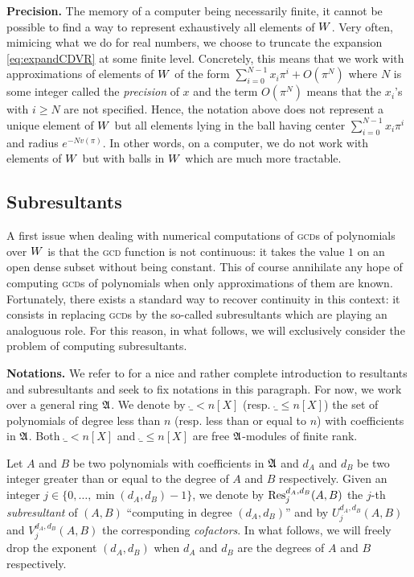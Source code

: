 \documentclass{sig-alternate}
\begin{document}
\noindent
\textbf{Precision.}
The memory of a computer being necessarily finite, it cannot be possible 
to find a way to represent exhaustively all elements of $W$. 
Very often, mimicing what we do for real numbers, we choose to truncate 
the expansion \eqref{eq:expandCDVR} at some finite level. Concretely,
this means that we work with approximations of elements of $W$ of the
form
$\sum_{i=0}^{N-1} x_i \pi^i + O(\pi^N)$
where $N$ is some integer called the \emph{precision} of $x$ and 
the term $O(\pi^N)$ means that the $x_i$'s with $i \geq N$ are not 
specified. Hence, the notation above does not represent a unique
element of $W$ but all elements lying in the ball having center
$\sum_{i=0}^{N-1} x_i \pi^i$ and radius $e^{-N v(\pi)}$. In other
words, on a computer, we do not work with elements of $W$ but with
balls in $W$ which are much more tractable.

\subsection{Subresultants}
\label{subsec:subres}

A first issue when dealing with numerical computations of \textsc{gcd}s 
of polynomials over $W$ is that the \textsc{gcd} function is not 
continuous: it takes the value $1$ on an open dense subset without being 
constant. This of course annihilate any hope of computing \textsc{gcd}s 
of polynomials when only approximations of them are known. Fortunately, 
there exists a standard way to recover continuity in this context: it 
consists in replacing \textsc{gcd}s by the so-called subresultants which 
are playing an analoguous role. For this reason, in what follows, we will 
exclusively consider the problem of computing subresultants.

\medskip

\noindent
\textbf{Notations.} We refer to \cite{resultant} for a nice and rather complete 
introduction to resultants and subresultants and seek to fix notations
in this paragraph. For now, we work over a 
general ring $\mathfrak A$. We denote by $\ring_{<n}[X]$ (resp. $\ring_{\leq 
n}[X]$) the set of polynomials of degree less than $n$ (resp. less than 
or equal to $n$) with coefficients in $\mathfrak A$. Both $\ring_{<n}[X]$ and 
$\ring_{\leq n}[X]$ are free $\mathfrak A$-modules of finite rank.

Let $A$ and $B$ be two polynomials with coefficients in $\mathfrak A$ and 
$d_A$ and $d_B$ be two integer greater than or equal to the degree of 
$A$ and $B$ respectively. Given an integer $j \in \{0, \ldots, \min 
(d_A, d_B)-1\}$, we denote by $\text{\rm Res}_j^{d_A, d_B}(A,B)$ the $j$-th 
\emph{subresultant} of $(A,B)$ ``computing in degree $(d_A, d_B)$'' and 
by $U_j^{d_A, d_B}(A,B)$ and $V_j^{d_A, d_B}(A,B)$ the corresponding 
\emph{cofactors}. In what follows, we will freely drop the exponent 
$(d_A,d_B)$ when $d_A$ and $d_B$ are the degrees of $A$ and $B$ 
respectively.
\end{document}
